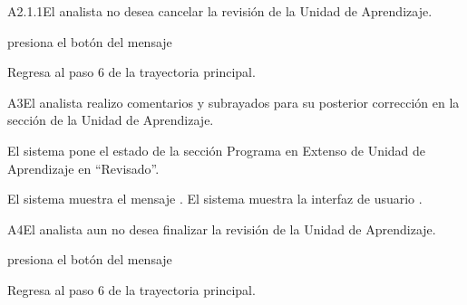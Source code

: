 \begin{UCtrayectoriaA}{A2.1.1}{El analista no desea cancelar la revisión de la Unidad de Aprendizaje.} 

	\hypertarget{SP2-CU6-A2.1.1}{\UCpaso[\UCactor] presiona el botón  del mensaje }
    \UCpaso Regresa al paso 6 de la trayectoria principal. 
\end{UCtrayectoriaA}


	
\begin{UCtrayectoriaA}{A3}{El analista realizo comentarios y subrayados para su posterior corrección en la sección de la Unidad de Aprendizaje.} 

	\hypertarget{SP2-CU6-A3}{\UCpaso El sistema pone el estado de la sección Programa en Extenso de Unidad de Aprendizaje en “Revisado”.}
    \UCpaso El sistema muestra el mensaje .
    \UCpaso El sistema muestra la interfaz de usuario .
\end{UCtrayectoriaA}

	
\begin{UCtrayectoriaA}{A4}{El analista aun no desea finalizar la revisión de la Unidad de Aprendizaje.} 

	\hypertarget{SP2-CU6-A4}{\UCpaso[\UCactor] presiona el botón  del mensaje }
    \UCpaso Regresa al paso 6 de la trayectoria principal. 
\end{UCtrayectoriaA}